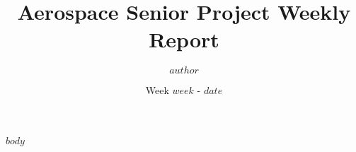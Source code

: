 \documentclass[12pt]{article}
\title{Aerospace Senior Project Weekly Report}
\author{$author$}
\date{Week $week$ - $date$}
\begin{document}
\maketitle

$body$
\end{document}
